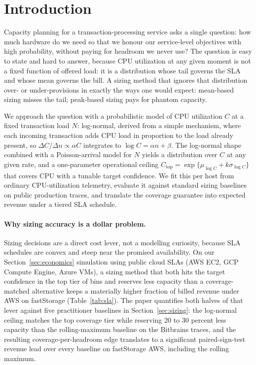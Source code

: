 \documentclass[11pt,a4paper]{article}
\newcommand{\Ctop}{C_{\text{top}}}
\begin{document}
\section{Introduction}

Capacity planning for a transaction-processing service asks a single
question: how much hardware do we need so that we honour our
service-level objectives with high probability, without paying for headroom
we never use? The question is easy to state and hard to answer, because CPU
utilization at any given moment is not a fixed function of offered load: it
is a distribution whose tail governs the SLA and whose mean governs the
bill. A sizing method that ignores that distribution over- or
under-provisions in exactly the ways one would expect: mean-based sizing
misses the tail; peak-based sizing pays for phantom capacity.

We approach the question with a probabilistic model of CPU utilization $C$
at a fixed transaction load $N$: log-normal, derived from a simple
mechanism, where each incoming transaction adds CPU load in proportion to
the load already present, so $\Delta C / \Delta n \propto \alpha C$
integrates to $\log C = \alpha n + \beta$. The log-normal shape combined
with a Poisson-arrival model for $N$ yields a distribution over $C$ at
any given rate, and a one-parameter operational ceiling
$\Ctop = \exp\{\mu_{\log C} + k\sigma_{\log C}\}$ that covers CPU with a
tunable target confidence. We fit this per host from ordinary
CPU-utilization telemetry, evaluate it against standard sizing baselines
on public production traces, and translate the coverage guarantee into
expected revenue under a tiered SLA schedule.

\paragraph{Why sizing accuracy is a dollar problem.} Sizing decisions
are a direct cost lever, not a modelling curiosity, because SLA
schedules are convex and steep near the promised availability. On our
Section~\ref{sec:economics} simulation using public cloud SLAs (AWS EC2,
GCP Compute Engine, Azure VMs), a sizing method that both hits the
target confidence in the top tier of bins and reserves less capacity
than a coverage-matched alternative keeps a materially higher fraction
of billed revenue under AWS on fastStorage (Table~\ref{tab:sla}). The
paper quantifies both halves of that lever against five practitioner
baselines in Section~\ref{sec:sizing}: the log-normal ceiling matches
the top coverage tier while reserving 20 to 30 percent less capacity
than the rolling-maximum baseline on the Bitbrains traces, and the
resulting coverage-per-headroom edge translates to a significant
paired-sign-test revenue lead over every baseline on fastStorage AWS,
including the rolling maximum.
\end{document}
